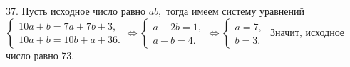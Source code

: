 37. Пусть исходное число равно $\overline{ab},$ тогда имеем систему уравнений $\begin{cases}10a+b=7a+7b+3,\\ 10a+b=10b+a+36.\end{cases}\Leftrightarrow
\begin{cases}a-2b=1,\\ a-b=4.\end{cases}\Leftrightarrow
\begin{cases}a=7,\\ b=3.\end{cases}$ Значит, исходное число равно 73.\\
